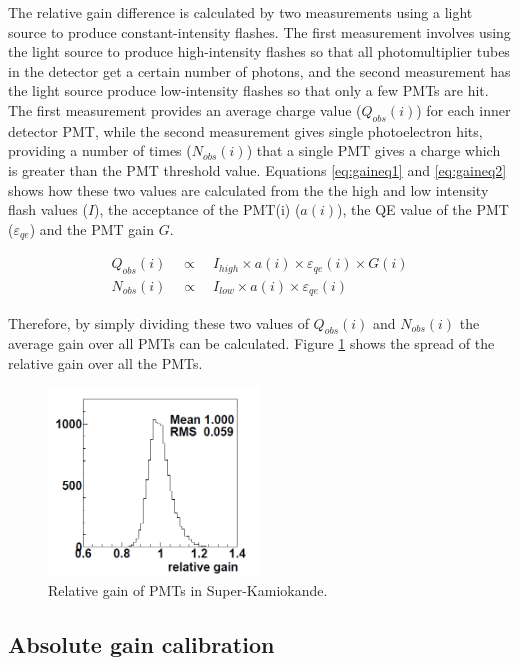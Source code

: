 The relative gain difference is calculated by two measurements using a light source to produce constant-intensity flashes. The first measurement involves using the light source to produce high-intensity flashes so that all photomultiplier tubes in the detector get a certain number of photons, and the second measurement has the light source produce low-intensity flashes so that only a few PMTs are hit. The first measurement provides an average charge value ($Q_{o b s}(i)$) for each inner detector PMT, while the second measurement gives single photoelectron hits, providing a number of times ($N_{o b s}(i)$) that a single PMT gives a charge which is greater than the PMT threshold value. Equations \ref{eq:gaineq1} and \ref{eq:gaineq2} shows how these two values are calculated from the the high and low intensity flash values ($I$), the acceptance of the PMT(i) ($a(i)$), the QE value of the PMT ($\varepsilon_{q e}$) and the PMT gain $G$. 

\begin{align}
Q_{o b s}(i) \quad \propto \quad I_{high} \times a(i) \times \varepsilon_{q e}(i) \times G(i) \label{eq:gaineq1} \\
N_{o b s}(i) \quad \propto \quad I_{low} \times a(i) \times \varepsilon_{q e}(i) \label{eq:gaineq2}
\end{align}


Therefore, by simply dividing these two values of $Q_{o b s}(i)$ and $N_{o b s}(i)$ the average gain over all PMTs can be calculated.  Figure \ref{fig:relativegain} shows the spread of the relative gain over all the PMTs. 

\begin{figure}
\centering
    \includegraphics[width=0.5\textwidth]{Figures/relativegain.png}
\caption{Relative gain of PMTs in Super-Kamiokande.}
    \label{fig:relativegain}
\end{figure}

\subsection{Absolute gain calibration}

